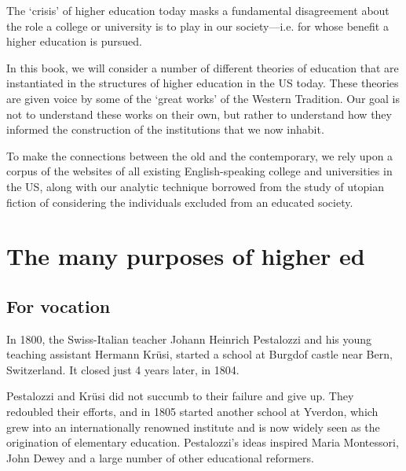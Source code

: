 The `crisis' of higher education today masks a fundamental disagreement about the role a college or university is to play in our society---i.e. for whose benefit a higher education is pursued. 

In this book, we will consider a number of different theories of education that are instantiated in the structures of higher education in the US today. These theories are given voice by some of the `great works' of the Western Tradition. Our goal is not to understand these works on their own, but rather to understand how they informed the construction of the institutions that we now inhabit. 

To make the connections between the old and the contemporary, we rely upon a corpus of the websites of all existing English-speaking college and universities in the US, along with our analytic technique borrowed from the study of utopian fiction of considering the individuals excluded from an educated society.

\part{The many purposes of higher ed}
\label{themanypurposesofhighered}

\chapter{For vocation}
\label{forvocation}


In 1800, the Swiss-Italian teacher Johann Heinrich Pestalozzi and his young teaching assistant Hermann Krüsi, started a school at Burgdof castle near Bern, Switzerland. It closed just 4 years later, in 1804. 

Pestalozzi and Krüsi did not succumb to their failure and give up. They redoubled their efforts, and in 1805 started another school at Yverdon, which grew into an internationally renowned institute and is now widely seen as the origination of elementary education. Pestalozzi's ideas inspired Maria Montessori, John Dewey and a large number of other educational reformers. 

